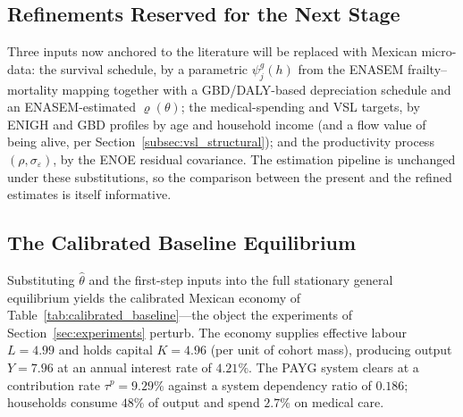 \documentclass[12pt,a4paper]{article}
\begin{document}
\subsection{Refinements Reserved for the Next Stage}
\label{subsec:roadmap}
Three inputs now anchored to the literature will be replaced with Mexican micro-data: the survival schedule, by a parametric $\psi^g_j(h)$ from the ENASEM frailty--mortality mapping together with a GBD/DALY-based depreciation schedule and an ENASEM-estimated $\varrho(\theta)$; the medical-spending and VSL targets, by ENIGH and GBD profiles by age and household income (and a flow value of being alive, per Section~\ref{subsec:vsl_structural}); and the productivity process $(\rho,\sigma_\varepsilon)$, by the ENOE residual covariance. The estimation pipeline is unchanged under these substitutions, so the comparison between the present and the refined estimates is itself informative.

\subsection{The Calibrated Baseline Equilibrium}
\label{subsec:calibrated_baseline}

Substituting $\widehat\theta$ and the first-step inputs into the full stationary general equilibrium yields the calibrated Mexican economy of Table~\ref{tab:calibrated_baseline}---the object the experiments of Section~\ref{sec:experiments} perturb. The economy supplies effective labour $L=4.99$ and holds capital $K=4.96$ (per unit of cohort mass), producing output $Y=7.96$ at an annual interest rate of $4.21\%$. The PAYG system clears at a contribution rate $\tau^p=9.29\%$ against a system dependency ratio of $0.186$; households consume $48\%$ of output and spend $2.7\%$ on medical care.
\end{document}
